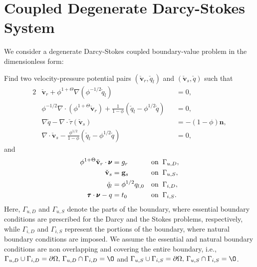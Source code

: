 \section{Coupled Degenerate Darcy-Stokes System}
\label{sec:darcystokes}
We consider a degenerate Darcy-Stokes coupled boundary-value problem in the dimensionless form:

Find two velocity-pressure potential pairs $(\check{\mathbf{v}}_r, \check{q}_l)$ and 
$(\check{\mathbf{v}}_s, \check{q})$ such that 
\begin{alignat}{2}
\label{eq:dimensionlessdarcy_flow_sc_bv}
		  &\check{\mathbf{v}}_r
		  + \phi^{1+\Theta}\nabla(\phi^{-1/2}\check{q}_l)
        &&= 0,\\
\label{eq:dimensionlessconsMass_flow_sc_bv}
		  &\phi^{-1/2}\nabla \cdot(\phi^{1+\Theta}\check{\mathbf{v}}_r)
        + \frac{1}{1-\phi}(\check{q}_l - \phi^{1/2}\check{q}) &&=0,\\
\label{eq:dimensionlessstokes_flow_sc_bv}
		  &\nabla \check{q} - \nabla \cdot \check{\tau}(\check{\mathbf{v}}_s) &&= -(1-\phi)\mathbf{n},\\
\label{eq:dimensionlesscompaction_flow_sc_bv}
		  &\nabla \cdot \check{\mathbf{v}}_s
        - \frac{\phi^{1/2}}{1-\phi}(\check{q}_l - \phi^{1/2}\check{q}) &&=0,
\end{alignat}
and
\begin{equation}\label{eq:bv}
		  \begin{alignedat}{2}
					 \phi^{1+\Theta}\check{\mathbf{v}}_r\cdot \pmb{\nu} &= g_{r} \quad &&\text{on} \hspace{0.2cm} \Gamma_{u,D}, \\
					 \check{\mathbf{v}}_s &= \mathbf{g}_{s} \quad &&\text{on} \hspace{0.2cm} \Gamma_{u,S}, \\
					 \check{q}_l &= \phi^{1/2}q_{l,0} \quad &&\text{on} \hspace{0.2cm} \Gamma_{i,D}, \\
					 \pmb{\tau}\cdot \pmb{\nu} - q &= t_0  \quad &&\text{on} \hspace{0.2cm} \Gamma_{i,S}.
		  \end{alignedat}
\end{equation}
Here, $\Gamma_{u,D}$ and $\Gamma_{u,S}$ denote the parts of the boundary, where essential boundary conditions 
are prescribed for 
the Darcy and the Stokes problems, respectively, 
while $\Gamma_{i,D}$ and $\Gamma_{i,S}$ represent the portions of the boundary, where natural boundary conditions 
are imposed.
We assume the essential and natural boundary conditions are non overlapping and covering
the entire boundary, i.e., $\Gamma_{u,D} \cup \Gamma_{i,D} = \partial \Omega, \, \Gamma_{u,D} \cap \Gamma_{i,D} = \O$ 
and $\Gamma_{u,S} \cup \Gamma_{i,S} = \partial \Omega, \, \Gamma_{u,S} \cap \Gamma_{i,S} = \O$.


